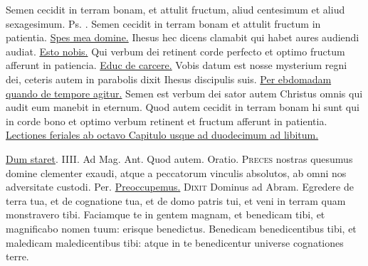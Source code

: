 \begin{multicols*}{2}
 Semen cecidit in terram bonam, et attulit fructum, aliud centesimum et aliud sexagesimum. {\color{Red} Ps.}
.
 Semen cecidit in terram bonam et attulit fructum in patientia. \R \hyperlink{spes-mea}{Spes mea domine.}
 Ihesus hec dicens clamabit qui habet aures audiendi audiat. \R \hyperlink{esto-nobis}{Esto nobis.}
 Qui verbum dei retinent corde perfecto et optimo fructum afferunt in patiencia. \R \hyperlink{educ-de-carcere}{Educ de carcere.}
 Vobis datum est nosse mysterium regni dei, ceteris autem in parabolis dixit Ihesus discipulis suis.
\newline \ul{Per ebdomadam quando de tempore agitur.}
 Semen est verbum dei sator autem Christus omnis qui audit eum manebit in eternum.
 Quod autem cecidit in terram bonam hi sunt qui in corde bono et optimo verbum retinent et fructum afferunt in patientia.
\newline \ul{Lectiones feriales ab octavo Capitulo usque ad duodecimum ad libitum.}
{\color{Red} }
\par {} \R \hyperlink{dum-staret}{Dum staret}. {\color{Red} IIII. Ad Mag. Ant.} Quod autem. {\color{Red} Oratio.} 
\lettrine[lines=2]{\zallmancaps \color{Red} P}{reces} nostras quesumus domine clementer exaudi, atque a peccatorum vinculis absolutos, ab omni nos adversitate custodi. Per.
 \hyperlink{preoccupemus-faciem-invitatorium}{Preoccupemus.}
\lettrine[lines=2]{\zallmancaps \color{Blue} D}{ixit} Dominus ad Abram. Egredere de terra tua, et de cognatione tua, et de domo patris tui, et veni in terram quam monstravero tibi. Faciamque te in gentem magnam, et benedicam tibi, et magnificabo nomen tuum: erisque benedictus. Benedicam benedicentibus tibi, et maledicam maledicentibus tibi: atque in te benedicentur universe cognationes terre. \R

\end{multicols*}
